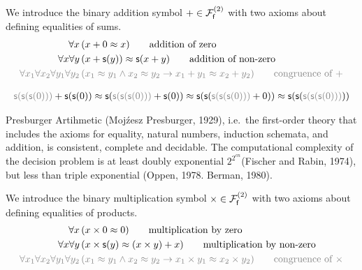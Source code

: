 \begin{definition}
	[Addition]
	\label{def:addition:axioms}
	We introduce the binary addition symbol $+\in\mcFfn[2]$ with two axioms about defining equalities of sums.
\begin{align*}
\forall x\,
&(x+0 \mEQ x) 
\tag*{addition of zero}\\
\forall x\forall y\,
&(x+\msucc(y)) \mEQ \msucc(x+y)
\tag*{addition of non-zero}
\\
\colG\forall x_1\forall x_2\forall y_1\forall y_2\,
&\colG (x_1\mEQ y_1\land x_2\mEQ y_2 \limp x_1+y_1\mEQ x_2+y_2)
\tag*{congruence of $+$}
\end{align*}
\end{definition}

\begin{example}
	\begin{gather*}
	{\colG \msucc(\msucc(\msucc(0)))} + \msucc(\msucc(0))
	\mEQ\msucc({\colG \msucc(\msucc(\msucc(0)))} + \msucc(0)) 
	\mEQ \msucc(\msucc(
	{\colG \msucc(\msucc(\msucc(0)))} + 0))
	\mEQ \msucc(\msucc(
	{\colG \msucc(\msucc(\msucc(0)))}))
	\end{gather*}
	\end{example}

\begin{theorem}Presburger Artihmetic (Moj\'{z}esz Presburger, 1929), i.e.~the first-order theory that includes the axioms for equality, natural numbers, induction schemata, and addition, is consistent, complete and decidable. The computational complexity of the decision problem is at least doubly exponential $2^{2^{cn}}$(Fischer and Rabin, 1974), but less than triple exponential (Oppen, 1978. Berman, 1980).
\end{theorem}

\begin{definition}
	[Multiplikation]
	\label{tab:addition:axioms}
	We introduce the binary multiplication symbol $\times\in\mcFfn[2]$
	with two axioms about defining equalities of products.
	\begin{align*}
	\forall x\,
	&(x\times 0 \mEQ 0) 
	\tag*{multiplication by zero}\\
	\forall x\forall y\,
	&(x\times\msucc(y) \mEQ (x\times y) + x)
	\tag*{multiplication by non-zero}
	\\
	\colG\forall x_1\forall x_2\forall y_1\forall y_2\,
	&\colG (x_1\mEQ y_1\land x_2\mEQ y_2 \limp x_1\times y_1\mEQ x_2 \times y_2)
	\tag*{congruence of $\times$}
	\end{align*}
\end{definition}

